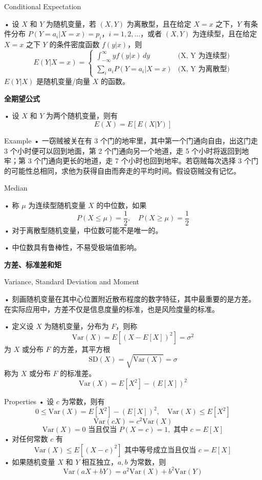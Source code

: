 \documentclass[UTF8]{report}
\theoremstyle{MyLineTheoremStyle} %
\theoremstyle{MyBlockTheoremStyle} %
\theoremstyle{MySubsubsectionStyle} %
\begin{document}
Conditional Expectation\par
• 设 $X$ 和 $Y$ 为随机变量，若 $(X, Y)$ 为离散型，且在给定 $X=x$ 之下，$Y$ 有条件分布 $P(Y = a_i | X = x) = p_i$，$i = 1, 2, \ldots$，或者 $(X, Y)$ 为连续型，且在给定 $X=x$ 之下 $Y$ 的条件密度函数 $f(y|x)$，则
\[
E(Y|X = x) = 
\begin{cases} 
\int_{-\infty}^{\infty} y f(y|x) \, dy & \text{(X, Y 为连续型)} \\ 
\sum_{i} a_i P(Y = a_i | X = x) & \text{(X, Y 为离散型)}
\end{cases}
\]
$E(Y|X)$ 是随机变量/向量 $X$ 的函数。

\textbf{全期望公式}\par
• 设 $X$ 和 $Y$ 为两个随机变量，则有
\[
E(X) = E[E(X|Y)]
\]

Example
• 一窃贼被关在有 3 个门的地牢里，其中第一个门通向自由，出这门走 3 个小时便可以回到地面，第 2 个门通向另一个地道，走 5 个小时将返回到地牢；第 3 个门通向更长的地道，走 7 个小时也回到地牢。若窃贼每次选择 3 个门的可能性总相同，求他为获得自由而奔走的平均时间。假设窃贼没有记忆。

Median\par
• 称 $\mu$ 为连续型随机变量 $X$ 的中位数，如果
\[
P(X \leq \mu) = \frac{1}{2}, \quad P(X \geq \mu) = \frac{1}{2}
\]
• 对于离散型随机变量，中位数可能不是唯一的。\par
• 中位数具有鲁棒性，不易受极端值影响。\par
\vspace{1cm}
\textbf{方差、标准差和矩}\par
Variance, Standard Deviation and Moment\par
• 刻画随机变量在其中心位置附近散布程度的数字特征，其中最重要的是方差。在实际应用中，方差不仅是信息度量的标准，也是风险度量的标准。\par
• 定义设 $X$ 为随机变量，分布为 $F$，则称
\[
\text{Var}(X) = E[(X - E[X])^2] = \sigma^2
\]
为 $X$ 或分布 $F$ 的方差，其平方根
\[
\text{SD}(X) = \sqrt{\text{Var}(X)} = \sigma
\]
称为 $X$ 或分布 $F$ 的标准差。
\[
\text{Var}(X) = E[X^2] - (E[X])^2
\]

Properties
• 设 $c$ 为常数，则有
\[
0 \leq \text{Var}(X) = E[X^2] - (E[X])^2, \quad \text{Var}(X) \leq E[X^2]
\]
\[
\text{Var}(cX) = c^2 \text{Var}(X)
\]
\[
\text{Var}(X) = 0 \text{ 当且仅当 } P(X = c) = 1, \text{ 其中 } c = E[X]
\]
• 对任何常数 $c$ 有
\[
\text{Var}(X) \leq E[(X - c)^2] \text{ 其中等号成立当且仅当 } c = E[X]
\]
• 如果随机变量 $X$ 和 $Y$ 相互独立，$a, b$ 为常数，则
\[
\text{Var}(aX + bY) = a^2 \text{Var}(X) + b^2 \text{Var}(Y)
\]
\end{document}
